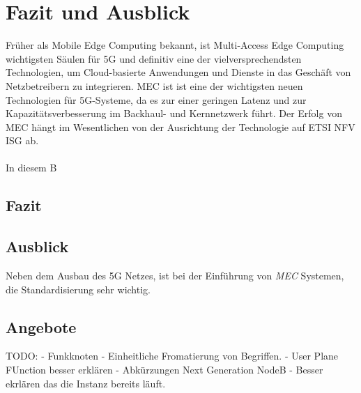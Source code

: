 \documentclass[runningheads]{llncs}
\numberwithin{figure}{section}
\begin{document}
\newpage

\section{Fazit und Ausblick}
Früher als Mobile Edge Computing bekannt, ist Multi-Access Edge Computing wichtigsten Säulen für 5G und 
definitiv eine der vielversprechendsten Technologien, 
um Cloud-basierte Anwendungen und Dienste in das Geschäft von Netzbetreibern zu integrieren.
MEC ist ist eine der wichtigsten neuen Technologien für 5G-Systeme, 
da es zur einer geringen Latenz und zur Kapazitätsverbesserung im Backhaul- und Kernnetzwerk führt. 
Der Erfolg von MEC hängt im Wesentlichen von der Ausrichtung der Technologie auf ETSI NFV ISG ab. 
\\
\\
In diesem B
\subsection{Fazit}
\subsection{Ausblick}
Neben dem Ausbau des 5G Netzes, ist bei der Einführung von \textit{MEC} Systemen, 
die Standardisierung sehr wichtig.  \cite{abdullahSegmentRoutingSoftware21}
\subsection{Angebote}
\label{subsec:Angebote}
\label{sec:Ausblick}


\newpage
%
\printbibliography[heading=bibintoc]
TODO: 
- Funkknoten
- Einheitliche Fromatierung von Begriffen.
- User Plane FUnction besser erklären
- Abkürzungen Next Generation NodeB 
- Besser ekrlären das die Instanz bereits läuft.
\end{document}
